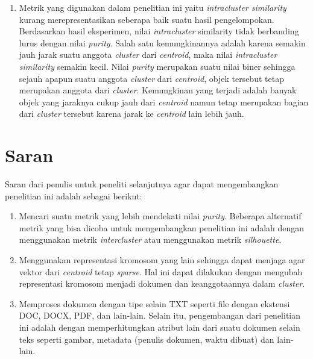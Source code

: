 \begin{enumerate}
	\item Metrik yang digunakan dalam penelitian ini yaitu \textit{intracluster similarity} kurang merepresentasikan seberapa baik suatu hasil pengelompokan. Berdasarkan hasil eksperimen, nilai \textit{intracluster} similarity tidak berbanding lurus dengan nilai \textit{purity}. Salah satu kemungkinannya adalah karena semakin jauh jarak suatu anggota \textit{cluster} dari \textit{centroid}, maka nilai \textit{intracluster similarity} semakin kecil. Nilai \textit{purity} merupakan suatu nilai biner sehingga sejauh apapun suatu anggota \textit{cluster} dari \textit{centroid}, objek tersebut tetap merupakan anggota dari \textit{cluster}. Kemungkinan yang terjadi adalah banyak objek yang jaraknya cukup jauh dari \textit{centroid} namun tetap merupakan bagian dari \textit{cluster} tersebut karena jarak ke \textit{centroid} lain lebih jauh.
\end{enumerate}

\section{Saran}
Saran dari penulis untuk peneliti selanjutnya agar dapat mengembangkan penelitian ini adalah sebagai berikut:

\begin{enumerate}
	\item Mencari suatu metrik yang lebih mendekati nilai \textit{purity}. Beberapa alternatif metrik yang bisa dicoba untuk mengembangkan penelitian ini adalah dengan menggunakan metrik \textit{intercluster} atau menggunakan metrik \textit{silhouette}.
	\item Menggunakan representasi kromosom yang lain sehingga dapat menjaga agar vektor dari \textit{centroid} tetap \textit{sparse}. Hal ini dapat dilakukan dengan mengubah representasi kromosom menjadi dokumen dan keanggotaannya dalam \textit{cluster}.
	\item Memproses dokumen dengan tipe selain TXT seperti file dengan ekstensi DOC, DOCX, PDF, dan lain-lain. Selain itu, pengembangan dari penelitian ini adalah dengan memperhitungkan atribut lain dari suatu dokumen selain teks seperti gambar, metadata (penulis dokumen, waktu dibuat) dan lain-lain.
\end{enumerate}